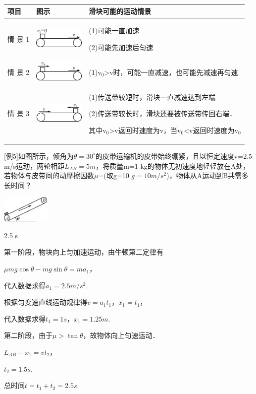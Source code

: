 \begin{longtable}[]{@{}m{1cm}m{2.5cm}m{10cm}@{}}
\toprule
项目 & 图示 & 滑块可能的运动情景\tabularnewline
\midrule
\endhead

情
景
1
&
\includegraphics[width=0.95833in,height=0.38542in]{media/image123.png}& 
(1)可能一直加速

(2)可能先加速后匀速\tabularnewline
情
景
2
&
\includegraphics[width=0.95833in,height=0.38542in]{media/image124.png}
 &
(1)$\mathrm v_0$\textgreater v时，可能一直减速，也可能先减速再匀速\tabularnewline

情
景
3
& 
\includegraphics[width=0.95833in,height=0.375in]{media/image125.png}
& 
(1)传送带较短时，滑块一直减速达到左端

(2)传送带较长时，滑块还要被传送带传回右端．

其中$\mathrm v_0$\textgreater v返回时速度为v，当$\mathrm v_0$\textless v返回时速度为$\mathrm v_0$\strut
\tabularnewline
\bottomrule
\end{longtable}
\newpage
{[}例5{]}如图所示，倾角为$\theta=30^\circ$的皮带运输机的皮带始终绷紧，且以恒定速度v=2.5
m/s运动，两轮相距$L_{AB}=5 m$，将质量m=1
kg的物体无初速度地轻轻放在A处，若物体与皮带间的动摩擦因数$\mu$=(取g=10
$g=10m/s^2$)，物体从A运动到B共需多长时间？

\begin{center}\includegraphics[width=0.90625in,height=0.51042in]{media/image126.png}\end{center}
\begin{solution}
2.5 s

	第一阶段，物块向上匀加速运动，由牛顿第二定律有

$\mu mg\cos \theta-mg\sin \theta=ma_1$，

代入数据求得$a_1=2.5 m/s^2$.

根据匀变速直线运动规律得$v=a_1t_1$，$x_1=t_1$，

代入数据求得$t_1=1 s$，$x_1=1.25 m$.

第二阶段，由于$\mu>\tan \theta$，故物体向上匀速运动．

$L_{AB}-x_1=vt_2$，

$t_2=1.5 s$.

总时间$t=t_1+t_2=2.5 s$.


\end{solution}


